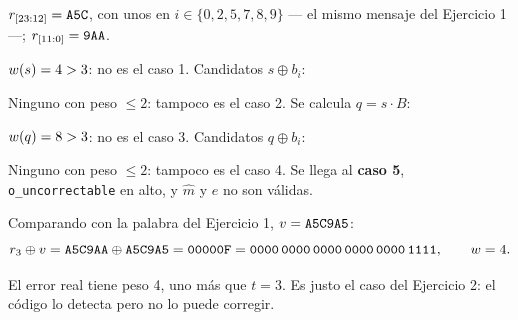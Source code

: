 \documentclass[11pt,a4paper]{article}
\begin{document}
$r_{[23:12]} = \texttt{A5C}$, con unos en $i\in\{0,2,5,7,8,9\}$ --- el mismo
mensaje del Ejercicio 1 ---; $r_{[11:0]} = \texttt{9AA}$.

\begin{center}\small
\begin{minipage}[b]{0.46\textwidth}\centering
  \rCXor
\end{minipage}\hfill
\begin{minipage}[b]{0.50\textwidth}\centering
  \rCSind
\end{minipage}
\end{center}

$w(s) = 4 > 3$: no es el caso 1. Candidatos $s \oplus b_i$:

\begin{center}\small
\rCTablaDos
\end{center}

Ninguno con peso $\le 2$: tampoco es el caso 2. Se calcula $q = s\cdot B$:

\begin{center}\small
\rCQ
\end{center}

$w(q) = 8 > 3$: no es el caso 3. Candidatos $q \oplus b_i$:

\begin{center}\small
\rCTablaCuatro
\end{center}

Ninguno con peso $\le 2$: tampoco es el caso 4. Se llega al \textbf{caso 5},
\texttt{o\_uncorrectable} en alto, y $\hat{m}$ y $e$ no son válidas.

Comparando con la palabra del Ejercicio 1, $v=\texttt{A5C9A5}$:
\[
  r_3 \oplus v = \texttt{A5C9AA} \oplus \texttt{A5C9A5}
  = \texttt{00000F} = \texttt{0000\,0000\,0000\,0000\,0000\,1111},
  \qquad w = 4 .
\]

El error real tiene peso 4, uno más que $t=3$. Es justo el caso del
Ejercicio 2: el código lo detecta pero no lo puede corregir.
\end{document}
